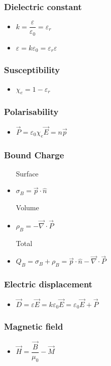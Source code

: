 \documentclass[]{report}
\newcommand \tab[1][1cm]{\hspace*{#1}}
\newcommand{\itemt}{\item \tab}
\begin{document}
\subsubsection{Dielectric constant}
\begin{itemize}
\itemt \( k = \dfrac{\varepsilon}{\varepsilon_0} = \varepsilon_r \)
\itemt \( \varepsilon = k\varepsilon_0 = \varepsilon_r \varepsilon\)
\end{itemize}

\subsubsection{Susceptibility}
\begin{itemize}
\itemt \( \chi_e = 1-\varepsilon_r \)
\end{itemize}

\subsubsection{Polarisability}
\begin{itemize}
\itemt \( \vec{P} = \varepsilon_0\chi_e\vec{E} = n\vec{p} \)
\end{itemize}

\subsubsection{Bound Charge}
\begin{itemize}
\item[Surface] 
\itemt \( \sigma_B = \vec{p}\cdot\hat{n} \)
\item[Volume]
\itemt \( \rho_B = -\vec{\nabla}\cdot\vec{P} \)
\item[Total]
\itemt \( Q_B = \sigma_B + \rho_B = \vec{p}\cdot\hat{n} -\vec{\nabla}\cdot\vec{P} \)
\end{itemize}

\subsubsection{Electric displacement}
\begin{itemize}
\itemt \( \vec{D} = \varepsilon \vec{E} = k\varepsilon_0 \vec{E} = \varepsilon_0\vec{E} + \vec{P} \)
\end{itemize}

\subsubsection{Magnetic field}
\begin{itemize}
\itemt \( \vec{H} = \dfrac{\vec{B}}{\mu_0} - \vec{M} \)
\end{itemize}
\end{document}
